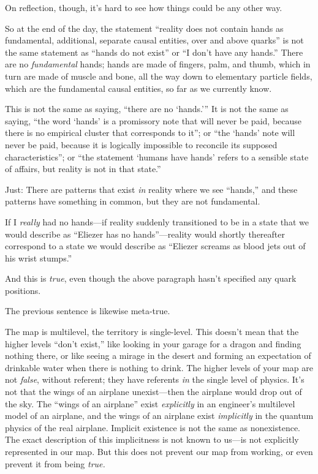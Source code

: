 {
 On reflection, though, it's hard to see how things
could be any other way.}

{
 So at the end of the day, the statement ``reality
does not contain hands as fundamental, additional, separate causal
entities, over and above quarks'' is not the same
statement as ``hands do not exist''
or ``I don't have any
hands.'' There are no \textit{fundamental} hands;
hands are made of fingers, palm, and thumb, which in turn are made of
muscle and bone, all the way down to elementary particle fields, which
are the fundamental causal entities, so far as we currently know.}

{
 This is not the same as saying, ``there are no
`hands.''' It is not
the same as saying, ``the word
`hands' is a promissory note that will
never be paid, because there is no empirical cluster that corresponds
to it''; or ``the
`hands' note will never be paid, because
it is logically impossible to reconcile its supposed
characteristics''; or ``the
statement `humans have hands' refers to
a sensible state of affairs, but reality is not in that
state.''}

{
 Just: There are patterns that exist \textit{in} reality where we
see ``hands,'' and these patterns
have something in common, but they are not fundamental.}

{
 If I \textit{really} had no hands---if reality suddenly
transitioned to be in a state that we would describe as
``Eliezer has no hands''---reality
would shortly thereafter correspond to a state we would describe as
``Eliezer screams as blood jets out of his wrist
stumps.''}

{
 And this is \textit{true}, even though the above paragraph
hasn't specified any quark positions.}

{
 The previous sentence is likewise meta-true.}

{
 The map is multilevel, the territory is single-level. This
doesn't mean that the higher levels
``don't exist,''
like looking in your garage for a dragon and finding nothing there, or
like seeing a mirage in the desert and forming an expectation of
drinkable water when there is nothing to drink. The higher levels of
your map are not \textit{false}, without referent; they have referents
\textit{in} the single level of physics. It's not that
the wings of an airplane unexist---then the airplane would drop out of
the sky. The ``wings of an
airplane'' exist \textit{explicitly} in an
engineer's multilevel model of an airplane, and the
wings of an airplane exist \textit{implicitly} in the quantum physics
of the real airplane. Implicit existence is not the same as
nonexistence. The exact description of this implicitness is not known
to us---is not explicitly represented in our map. But this does not
prevent our map from working, or even prevent it from being
\textit{true.}}

